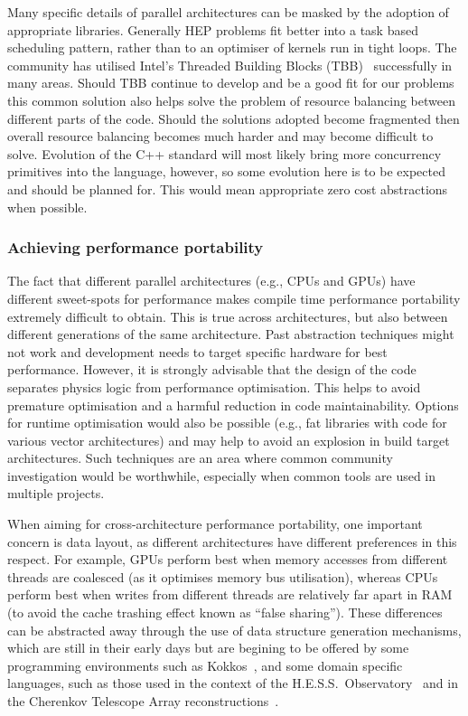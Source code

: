 \documentclass[12pt,a4paper]{article}
\begin{document}
Many specific details of parallel architectures can be masked by the
adoption of appropriate libraries. Generally HEP problems fit better
into a task based scheduling pattern, rather than to an optimiser of
kernels run in tight loops. The community has utilised Intel's Threaded
Building Blocks (TBB)~\cite{Pheatt:2008:ITB:1352079.1352134,TBB} successfully in
many areas. Should TBB continue to develop and be a good fit for our problems
this common solution also helps solve the problem of resource balancing between different parts of
the code. Should the solutions adopted become fragmented then overall
resource balancing becomes much harder and may become difficult to
solve. Evolution of the C++ standard will most likely bring more
concurrency primitives into the language, however, so some evolution
here is to be expected and should be planned for. This would mean
appropriate zero cost abstractions when possible.

\hypertarget{achieving-performance-portability}{%
\subsubsection{Achieving performance
portability~}\label{achieving-performance-portability}}

The fact that different parallel architectures (e.g., CPUs and GPUs) have
different sweet-spots for performance makes compile time performance
portability extremely difficult to obtain. This is true across
architectures, but also between different generations of the same
architecture. Past abstraction techniques might not work and development
needs to target specific hardware for best performance. However, it is
strongly advisable that the design of the code separates physics logic
from performance optimisation. This helps to avoid premature
optimisation and a harmful reduction in code maintainability. Options
for runtime optimisation would also be possible (e.g., fat libraries
with code for various vector architectures) and may help to avoid an
explosion in build target architectures. Such techniques are an area
where common community investigation would be worthwhile, especially
when common tools are used in multiple projects.

When aiming for cross-architecture performance portability, one
important concern is data layout, as different architectures have
different preferences in this respect. For example, GPUs perform best
when memory accesses from different threads are coalesced (as it
optimises memory bus utilisation), whereas CPUs perform best when writes
from different threads are relatively far apart in RAM (to avoid the
cache trashing effect known as ``false sharing''). These differences can
be abstracted away through the use of data structure generation mechanisms,
which are still in their early days but are begining to be offered by some
programming environments such as
Kokkos~\cite{CarterEdwards20143202},
and some domain specific languages, such as those used in the context of the
H.E.S.S.\ Observatory~\cite{HESS} and in the Cherenkov Telescope Array
reconstructions~\cite{CTA}.
\end{document}
